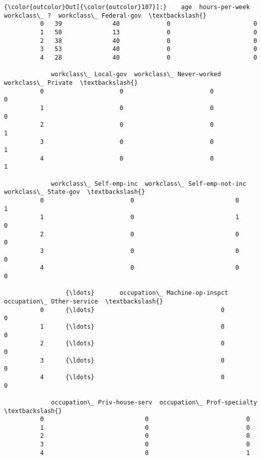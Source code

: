 \documentclass[11pt]{article}
\begin{document}
\begin{Verbatim}[commandchars=\\\{\}]
{\color{outcolor}Out[{\color{outcolor}107}]:}    age  hours-per-week  workclass\_ ?  workclass\_ Federal-gov  \textbackslash{}
          0   39              40             0                       0   
          1   50              13             0                       0   
          2   38              40             0                       0   
          3   53              40             0                       0   
          4   28              40             0                       0   
          
             workclass\_ Local-gov  workclass\_ Never-worked  workclass\_ Private  \textbackslash{}
          0                     0                        0                   0   
          1                     0                        0                   0   
          2                     0                        0                   1   
          3                     0                        0                   1   
          4                     0                        0                   1   
          
             workclass\_ Self-emp-inc  workclass\_ Self-emp-not-inc  workclass\_ State-gov  \textbackslash{}
          0                        0                            0                     1   
          1                        0                            1                     0   
          2                        0                            0                     0   
          3                        0                            0                     0   
          4                        0                            0                     0   
          
                 {\ldots}       occupation\_ Machine-op-inspct  occupation\_ Other-service  \textbackslash{}
          0      {\ldots}                                   0                          0   
          1      {\ldots}                                   0                          0   
          2      {\ldots}                                   0                          0   
          3      {\ldots}                                   0                          0   
          4      {\ldots}                                   0                          0   
          
             occupation\_ Priv-house-serv  occupation\_ Prof-specialty  \textbackslash{}
          0                            0                           0   
          1                            0                           0   
          2                            0                           0   
          3                            0                           0   
          4                            0                           1   
          

\end{Verbatim}
\end{document}
